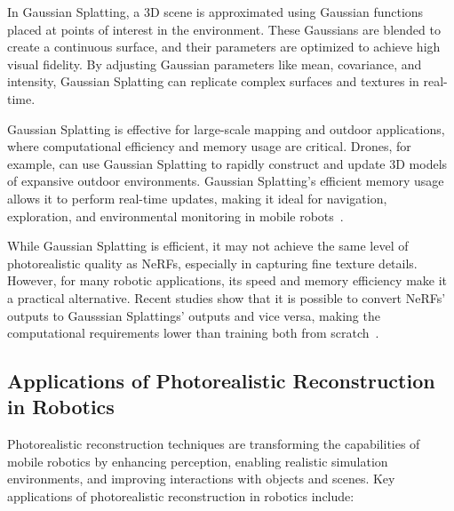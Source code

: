 In Gaussian Splatting, a 3D scene is approximated using Gaussian functions placed at points of interest in the environment. These Gaussians are blended to create a continuous surface, and their parameters are optimized to achieve high visual fidelity. By adjusting Gaussian parameters like mean, covariance, and intensity, Gaussian Splatting can replicate complex surfaces and textures in real-time.

Gaussian Splatting is effective for large-scale mapping and outdoor applications, where computational efficiency and memory usage are critical. Drones, for example, can use Gaussian Splatting to rapidly construct and update 3D models of expansive outdoor environments. Gaussian Splatting’s efficient memory usage allows it to perform real-time updates, making it ideal for navigation, exploration, and environmental monitoring in mobile robots~\cite{active_splat}.

While Gaussian Splatting is efficient, it may not achieve the same level of photorealistic quality as NeRFs, especially in capturing fine texture details. However, for many robotic applications, its speed and memory efficiency make it a practical alternative. Recent studies show that it is possible to convert NeRFs' outputs to Gausssian Splattings' outputs and vice versa, making the computational requirements lower than training both from scratch~\cite{nerf_gsplat_convert}.

\subsection{Applications of Photorealistic Reconstruction in Robotics}

Photorealistic reconstruction techniques are transforming the capabilities of mobile robotics by enhancing perception, enabling realistic simulation environments, and improving interactions with objects and scenes. Key applications of photorealistic reconstruction in robotics include:

